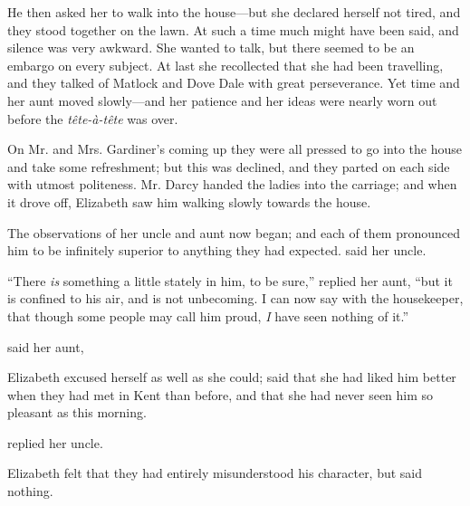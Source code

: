 He then asked her to walk into the house---but she declared herself not tired, and they stood together on the lawn. At such a time much might have been said, and silence was very awkward. She wanted to talk, but there seemed to be an embargo on every subject. At last she recollected that she had been travelling, and they talked of Matlock and Dove Dale with great perseverance. Yet time and her aunt moved slowly---and her patience and her ideas were nearly worn out before the {\em tête-à-tête} was over.

On Mr. and Mrs. Gardiner's coming up they were all pressed to go into the house and take some refreshment; but this was declined, and they parted on each side with utmost politeness. Mr. Darcy handed the ladies into the carriage; and when it drove off, Elizabeth saw him walking slowly towards the house.

The observations of her uncle and aunt now began; and each of them pronounced him to be infinitely superior to anything they had expected.  said her uncle.

“There {\em is} something a little stately in him, to be sure,” replied her aunt, “but it is confined to his air, and is not unbecoming. I can now say with the housekeeper, that though some people may call him proud, {\em I} have seen nothing of it.”


 said her aunt, 

Elizabeth excused herself as well as she could; said that she had liked him better when they had met in Kent than before, and that she had never seen him so pleasant as this morning.

 replied her uncle. 

Elizabeth felt that they had entirely misunderstood his character, but said nothing.

